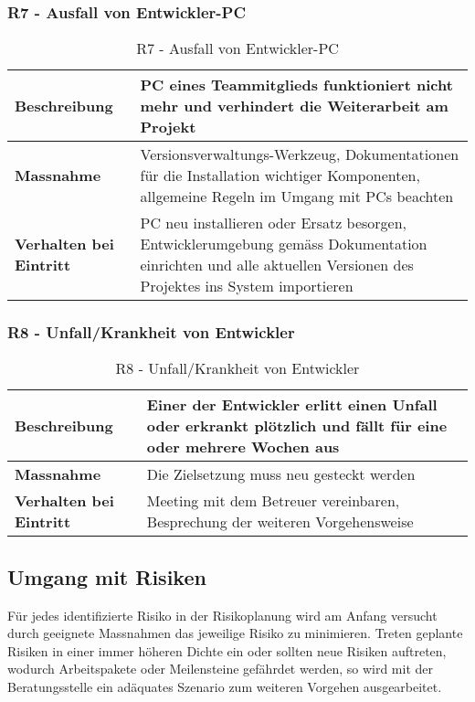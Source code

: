 \subsubsection{R7 - Ausfall von Entwickler-PC}
\begin{table}[H]
    \centering
    \def\arraystretch{2}
    \begin{tabular}{| p{4.5cm} | p{11.5cm} |} \hline
        \textbf{Beschreibung} & PC eines Teammitglieds funktioniert nicht mehr und verhindert die Weiterarbeit am Projekt \\ \hline
        \textbf{Massnahme} & Versionsverwaltungs-Werkzeug, Dokumentationen für die Installation wichtiger Komponenten, allgemeine Regeln im Umgang mit PCs beachten\\ \hline
        \textbf{Verhalten bei Eintritt} & PC neu installieren oder Ersatz besorgen, Entwicklerumgebung gemäss Dokumentation einrichten und alle aktuellen Versionen des Projektes ins System importieren \\ \hline 
    \end{tabular}
    \caption{R7 - Ausfall von Entwickler-PC}
\end{table}

\subsubsection{R8 - Unfall/Krankheit von Entwickler}
\begin{table}[H]
    \centering
    \def\arraystretch{2}
    \begin{tabular}{| p{4.5cm} | p{11.5cm} |} \hline
        \textbf{Beschreibung} & Einer der Entwickler erlitt einen Unfall oder erkrankt plötzlich und fällt für eine oder mehrere Wochen aus\\ \hline
        \textbf{Massnahme} & Die Zielsetzung muss neu gesteckt werden\\ \hline
        \textbf{Verhalten bei Eintritt} & Meeting mit dem Betreuer vereinbaren, Besprechung der weiteren Vorgehensweise\\ \hline 
    \end{tabular}
    \caption{R8 - Unfall/Krankheit von Entwickler}
\end{table}

\subsection{Umgang mit Risiken}
Für jedes identifizierte Risiko in der Risikoplanung wird am Anfang versucht durch geeignete Massnahmen das jeweilige Risiko zu minimieren. Treten geplante Risiken in einer immer höheren Dichte ein oder sollten neue Risiken auftreten, wodurch Arbeitspakete oder Meilensteine gefährdet werden, so wird mit der Beratungsstelle ein adäquates Szenario zum weiteren Vorgehen ausgearbeitet.
